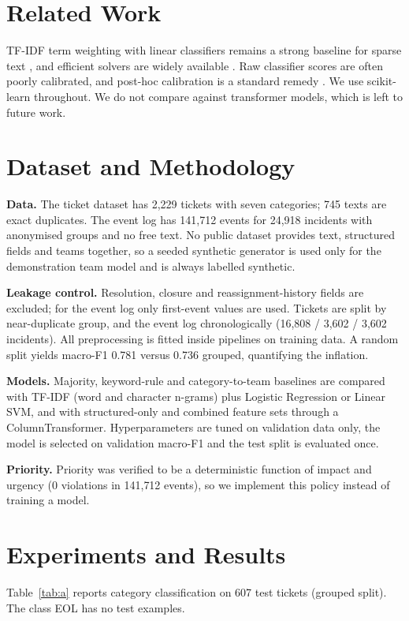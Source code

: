\documentclass[conference]{IEEEtran}
\begin{document}
\section{Related Work}
TF-IDF term weighting \cite{salton1988} with linear classifiers remains a strong baseline for sparse text \cite{joachims1998}, and efficient solvers are widely available \cite{fan2008}. Raw classifier scores are often poorly calibrated, and post-hoc calibration is a standard remedy \cite{niculescu2005,guo2017}. We use scikit-learn \cite{pedregosa2011} throughout. We do not compare against transformer models, which is left to future work.

\section{Dataset and Methodology}
\textbf{Data.} The ticket dataset \cite{zenodotickets} has 2{,}229 tickets with seven categories; 745 texts are exact duplicates. The event log \cite{uciincident} has 141{,}712 events for 24{,}918 incidents with anonymised groups and no free text. No public dataset provides text, structured fields and teams together, so a seeded synthetic generator is used only for the demonstration team model and is always labelled synthetic.

\textbf{Leakage control.} Resolution, closure and reassignment-history fields are excluded; for the event log only first-event values are used. Tickets are split by near-duplicate group, and the event log chronologically (16{,}808 / 3{,}602 / 3{,}602 incidents). All preprocessing is fitted inside pipelines on training data. A random split yields macro-F1 0.781 versus 0.736 grouped, quantifying the inflation.

\textbf{Models.} Majority, keyword-rule and category-to-team baselines are compared with TF-IDF (word and character n-grams) plus Logistic Regression or Linear SVM, and with structured-only and combined feature sets through a ColumnTransformer. Hyperparameters are tuned on validation data only, the model is selected on validation macro-F1 and the test split is evaluated once.

\textbf{Priority.} Priority was verified to be a deterministic function of impact and urgency (0 violations in 141{,}712 events), so we implement this policy instead of training a model.

\section{Experiments and Results}
Table~\ref{tab:a} reports category classification on 607 test tickets (grouped split). The class EOL has no test examples.
\end{document}
